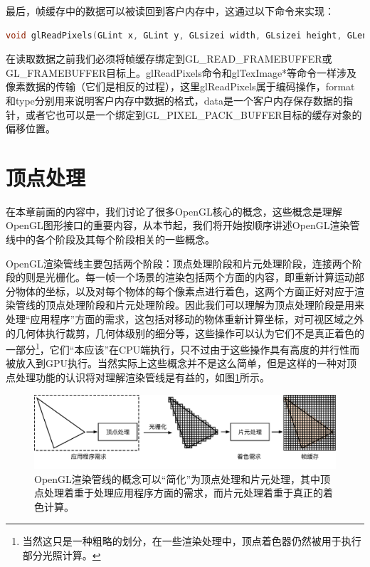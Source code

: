 最后，帧缓存中的数据可以被读回到客户内存中，这通过以下命令来实现：

\begin{lstlisting}[language=C++]
void glReadPixels(GLint x​, GLint y​, GLsizei width​, GLsizei height​, GLenum format​, GLenum type​, GLvoid * data​);
\end{lstlisting}

在读取数据之前我们必须将帧缓存绑定到GL\_READ\_FRAMEBUFFER或 GL\_FRAMEBUFFER目标上。glReadPixels命令和glTexImage*等命令一样涉及像素数据的传输（它们是相反的过程），这里glReadPixels属于编码操作，format和type分别用来说明客户内存中数据的格式，data是一个客户内存保存数据的指针，或者它也可以是一个绑定到GL\_PIXEL\_PACK\_BUFFER目标的缓存对象的偏移位置。






\section{顶点处理}\label{sec:api-vertex-phase}
在本章前面的内容中，我们讨论了很多OpenGL核心的概念，这些概念是理解OpenGL图形接口的重要内容，从本节起，我们将开始按顺序讲述OpenGL渲染管线中的各个阶段及其每个阶段相关的一些概念。

OpenGL渲染管线主要包括两个阶段：顶点处理阶段和片元处理阶段，连接两个阶段的则是光栅化。每一帧一个场景的渲染包括两个方面的内容，即重新计算运动部分物体的坐标，以及对每个物体的每个像素点进行着色，这两个方面正好对应于渲染管线的顶点处理阶段和片元处理阶段。因此我们可以理解为顶点处理阶段是用来处理“应用程序”方面的需求，这包括对移动的物体重新计算坐标，对可视区域之外的几何体执行裁剪，几何体级别的细分等，这些操作可以认为它们不是真正着色的一部分\footnote{当然这只是一种粗略的划分，在一些渲染处理中，顶点着色器仍然被用于执行部分光照计算。}，它们“本应该”在CPU端执行，只不过由于这些操作具有高度的并行性而被放入到GPU执行。当然实际上这些概念并不是这么简单，但是这样的一种对顶点处理功能的认识将对理解渲染管线是有益的，如图\ref{f:api-vertex-pixel}所示。

\begin{figure}
	\includegraphics[width=1.\textwidth]{figures/api/vertex-pixel}
	\caption{OpenGL渲染管线的概念可以“简化”为顶点处理和片元处理，其中顶点处理着重于处理应用程序方面的需求，而片元处理着重于真正的着色计算。}
	\label{f:api-vertex-pixel}
\end{figure}



